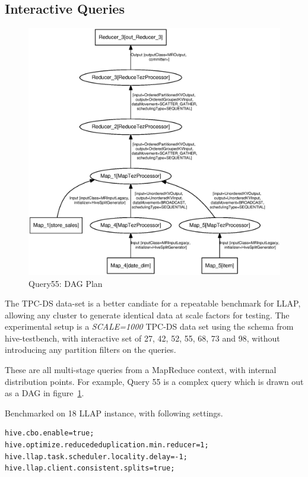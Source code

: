 \subsection{Interactive Queries}

\begin{figure}[bthp]
\centering
\includegraphics[width=0.8\columnwidth]{figures/q55.eps}
\caption{Query55: DAG Plan}
\label{fig:q55}
\end{figure} 


The TPC-DS data-set is a better candiate for a repeatable benchmark for LLAP, allowing any cluster to generate
identical data at scale factors for testing. The experimental setup is a \emph{SCALE=1000} TPC-DS data set using the 
schema from hive-testbench\cite{testbench}, with interactive set of 27, 42, 52, 55, 68, 73 and 98, without
introducing any partition filters on the queries.

These are all multi-stage queries from a MapReduce context, with internal distribution points. For example, Query 55
is a complex query which is drawn out as a DAG in figure~\ref{fig:q55}.  

Benchmarked on 18 LLAP instance, with following settings.

\begin{lstlisting}
hive.cbo.enable=true;
hive.optimize.reducededuplication.min.reducer=1;
hive.llap.task.scheduler.locality.delay=-1;
hive.llap.client.consistent.splits=true;
\end{lstlisting}

